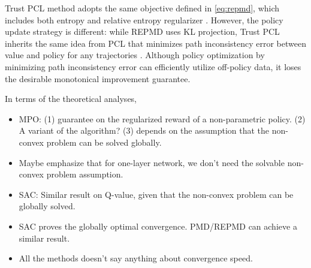 Trust PCL method adopts the same objective defined in \cref{eq:repmd}, which includes both entropy and relative entropy regularizer \citep{nachum2017trust}. However, the policy update strategy is different: while REPMD uses KL projection, Trust PCL inherits the same idea from PCL that minimizes path inconsistency error between value and policy for any trajectories \citep{nachum2017bridging}. Although policy optimization by minimizing path inconsistency error can efficiently utilize off-policy data, it loses the desirable monotonical improvement guarantee.

In terms of the theoretical analyses, 
\begin{itemize}
	\item MPO: (1) guarantee on the regularized reward of a non-parametric policy. (2) A variant of the algorithm? (3) depends on the assumption that the non-convex problem can be solved globally.
	\item Maybe emphasize that for one-layer network, we don't need the solvable non-convex problem assumption.
	\item SAC: Similar result on Q-value, given that the non-convex problem can be globally solved.
	\item SAC proves the globally optimal convergence. PMD/REPMD can achieve a similar result.
	\item All the methods doesn't say anything about convergence speed.
\end{itemize}






